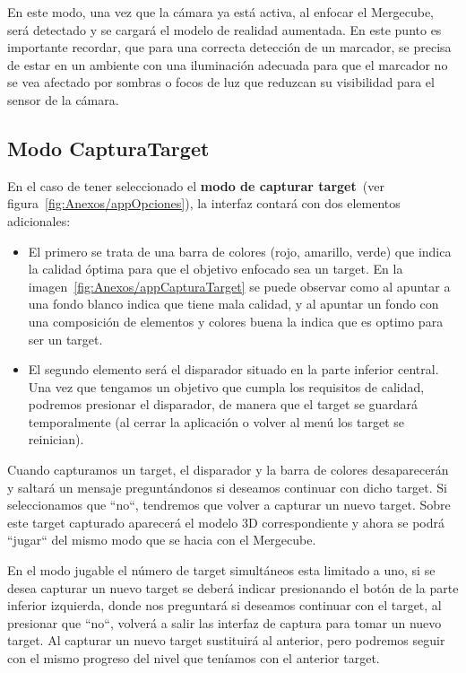 En este modo, una vez que la cámara ya está activa, al enfocar el Mergecube, será detectado y se cargará el modelo de realidad aumentada. En este punto es importante recordar, que para una correcta detección de un marcador, se precisa de estar en un ambiente con una iluminación adecuada para que el marcador no se vea afectado por sombras o focos de luz que reduzcan su visibilidad para el sensor de la cámara.


\subsection{Modo CapturaTarget}

En el caso de tener seleccionado el \textbf{modo de capturar target}~(ver figura~\ref{fig:Anexos/appOpciones}), la interfaz contará con dos elementos adicionales: 
\begin{itemize}
	\item El primero se trata de una barra de colores (rojo, amarillo, verde) que indica la calidad óptima para que el objetivo enfocado sea un target. En la imagen~\ref{fig:Anexos/appCapturaTarget} se puede observar como al apuntar a una fondo blanco indica que tiene mala calidad, y al apuntar un fondo con una composición de elementos y colores buena la indica que es optimo para ser un target.
	\item El segundo elemento será el disparador situado en la parte inferior central. Una vez que tengamos un objetivo que cumpla los requisitos de calidad, podremos presionar el disparador, de manera que el target se guardará temporalmente (al cerrar la aplicación o volver al menú los target se reinician). 
\end{itemize}

Cuando capturamos un target, el disparador y la barra de colores desaparecerán y saltará un mensaje preguntándonos si deseamos continuar con dicho target. Si seleccionamos que ``no``, tendremos que volver a capturar un nuevo target. Sobre este target capturado aparecerá el modelo 3D correspondiente y ahora se podrá ``jugar`` del mismo modo que se hacia con el Mergecube. 

En el modo jugable el número de target simultáneos esta limitado a uno, si se desea capturar un nuevo target se deberá indicar presionando el botón de la parte inferior izquierda, donde nos preguntará si deseamos continuar con el target, al presionar que ``no``, volverá a salir las interfaz de captura para tomar un nuevo target. Al capturar un nuevo target sustituirá al anterior, pero podremos seguir con el mismo progreso del nivel que teníamos con el anterior target. 

